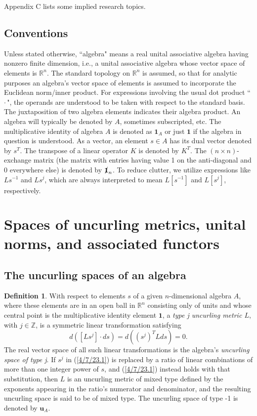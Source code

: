 \documentclass{amsart}
\numberwithin{equation}{section}
\theoremstyle{definition}
\newtheorem{definition}[theorem]{Definition}
\numberwithin{theorem}{section}
\begin{document}
 Appendix C lists some implied research topics. 
 
 
 \subsection{Conventions}   Unless stated otherwise, ``algebra" means a real unital associative algebra having nonzero finite dimension, i.e., a unital associative algebra whose vector space of elements is $\mathbb{R}^n$. The standard topology on $\mathbb{R}^n$ is assumed, so that for analytic purposes an algebra's vector space of elements is assumed to incorporate the Euclidean norm/inner product.  For expressions involving the usual dot product ``\,$\cdot$\,", the operands are understood to be taken with respect to the standard basis. The juxtaposition of two algebra elements indicates their algebra product.  An algebra will typically be denoted by $A$, sometimes subscripted, etc. The multiplicative identity of algebra $A$ is denoted as $\mathbf{1}_A$ or just $\mathbf{1}$ if the algebra in question is understood.   As a vector, an element $s\in A$ has its dual vector denoted by $s^T$.  The transpose of a linear operator $K$ is denoted by $K^T$.  The $(n\times n)$-exchange matrix (the matrix with entries having value 1 on the anti-diagonal and 0 everywhere else) is denoted by  $\slashed{\bf 1}_n$.  To reduce clutter, we utilize  expressions like $Ls^{-1}$ and $Ls^j$, which are always interpreted to mean $L[s^{-1}]$ and $L[s^j]$, respectively.  
 
 

 \section{Spaces of uncurling metrics, unital norms, and associated  functors}  
      \subsection{The uncurling spaces of an algebra}  
         \begin{definition}\label{7/21/23.1} With respect to elements $s$ of a given $n$-dimensional algebra $A$, where these elements are in an open ball in $\mathbb{R}^n$ consisting only of units and whose central point is the multiplicative identity element $\mathbf{1}$, a  {\it type j uncurling metric $L$}, with $j\in \mathbb{Z}$, is a symmetric linear transformation  satisfying \begin{equation}\label{4/7/23.1} d([Ls^j]\cdot ds) = d\left((s^j)^T L ds\right) = 0. \end{equation}  The real vector space of all such linear transformations is the algebra's {\it uncurling space of type j}.  If $s^j$ in (\ref{4/7/23.1}) is replaced by a ratio of linear combinations of more than one integer power of $s$, and (\ref{4/7/23.1}) instead holds with that substitution, then $L$ is an uncurling metric of mixed type defined by the exponents appearing in the ratio's numerator and denominator, and the resulting uncurling space is said to be of mixed type.   The uncurling space of type -1 is denoted by $\mathbf{u}_A$.   \end{definition}
\end{document}
